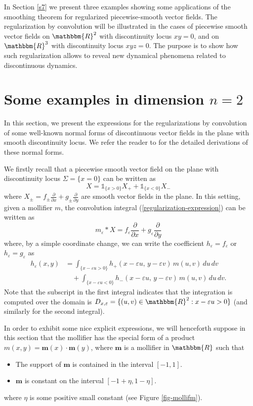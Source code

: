 \documentclass[11pt,psamsfonts]{article}
\theoremstyle{definition}
\theoremstyle{remark}
\newcommand{\cR}{\ensuremath{\mathbbm{R}}}
\newcommand{\eps}{\varepsilon }
\begin{document}
In Section \ref{s7} we present three examples showing some applications of the 
smoothing theorem for regularized piecewise-smooth vector fields.  The regularization by convolution will be illustrated in the cases of piecewise smooth vector fields on $\cR^2$ with discontinuity locus $xy=0$, and on $\cR^3$ with discontinuity locus $xyz=0$. 
The purpose is to show how such regularization allows to reveal new dynamical phenomena related to discontinuous dynamics.

\section{Some examples in dimension $n=2$}\label{section-examples-Paulo} 
In this section, we present the expressions for the regularizations by convolution of some well-known normal forms of 
discontinuous vector fields in the plane with smooth discontinuity locus. We refer the reader to \cite{BPT} for the detailed derivations of these normal forms. 

We firstly recall that a piecewise smooth vector field on the plane with discontinuity locus $\Sigma =\{x=0\}$ can be written as
$$
X = \mathds{1}_{\{x>0\}} X_+ + \mathds{1}_{\{x<0\}} X_-
$$
where $X_{\pm} = f_\pm \frac{\partial}{\partial x} + g_\pm \frac{\partial}{\partial y}$ are smooth vector fields in the plane. In this setting, given a mollifier $m$, the convolution integral (\ref{regularization-expression}) can be written as
$$
m_\eps \ast X = f_\eps \frac{\partial}{\partial x} + g_\eps \frac{\partial}{\partial y}
$$
where, by a simple coordinate change, we can write the coefficient $h_\eps = f_\eps$ or $h_\eps = g_\eps$ as
\[
\begin{aligned}
h_\varepsilon(x,y)
&= \int_{\{x-\varepsilon u>0\}}
   h_+(x-\varepsilon u,\,y-\varepsilon v)\, m(u,v)\,du\,dv \\
&\quad + \int_{\{x-\varepsilon u<0\}}
   h_-(x-\varepsilon u,\,y-\varepsilon v)\, m(u,v)\,du\,dv .
\end{aligned}
\]
Note that the subscript in the first integral indicates that the integration is computed over the domain is $D_{x,\eps} = \{(u,v)\in \cR^2 :  x - \varepsilon u > 0\}$ (and similarly for the second integral). 

In order to exhibit some nice explicit expressions, we will henceforth suppose in this section that the mollifier has the special form of a product $m(x,y) = \mathbf{m}(x)\cdot\mathbf{m}(y)$, where $\mathbf{m}$ is a mollifier in $\cR$ such that
\begin{itemize}
    \item The support of $\mathbf{m}$ is contained in the interval $[-1,1]$.
    \item $\mathbf{m}$ is constant on the interval  $\left[-1 + \eta,1 - \eta\right]$.
\end{itemize}
where $\eta$ is some positive small constant (see Figure \ref{fig-mollifm}). 
\end{document}
